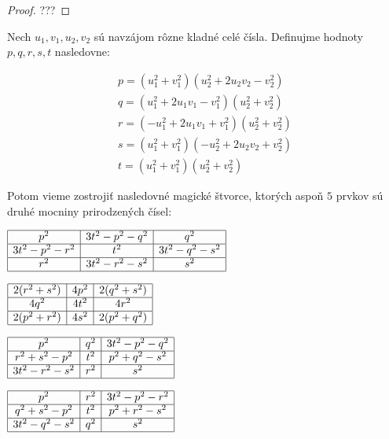 \begin{proof} 
???
\end{proof}

\begin{theorem}
\label{3x3square5squares}
Nech $u_1, v_1, u_2, v_2$ sú navzájom rôzne kladné celé čísla. Definujme hodnoty $p,q,r,s,t$ nasledovne:

\begin{gather}
p = (u_1^2 + v_1^2)(u_2^2 + 2u_2 v_2 - v_2^2) \\
q = (u_1^2 + 2u_1 v_1 - v_1^2)(u_2^2 + v_2^2) \\
r = (- u_1^2 + 2u_1 v_1 + v_1^2)(u_2^2 + v_2^2) \\
s = (u_1^2 + v_1^2)(-u_2^2 + 2u_2 v_2 + v_2^2) \\
t = (u_1^2 + v_1^2)(u_2^2 + v_2^2)
\end{gather}

Potom vieme zostrojiť nasledovné magické štvorce, ktorých aspoň $5$ prvkov sú druhé mocniny prirodzených čísel:
\end{theorem}

\begin{center}
$\begin{array}{ |c|c|c| } 
\hline
p^2 & 3t^2 - p^2 - q^2 & q^2 \\ 
\hline
3t^2 - p^2 - r^2 & t^2 & 3t^2 - q^2 - s^2 \\ 
\hline
r^2 & 3t^2 - r^2 - s^2 & s^2 \\
\hline
\end{array}$

$\begin{array}{ |c|c|c| } 
\hline
2(r^2 + s^2) & 4p^2 & 2(q^2 + s^2) \\ 
\hline
4q^2 & 4t^2 & 4r^2 \\ 
\hline
2(p^2 + r^2) & 4s^2 & 2(p^2 + q^2) \\
\hline
\end{array}$

$\begin{array}{ |c|c|c| } 
\hline
p^2 & q^2 & 3t^2 - p^2 - q^2 \\ 
\hline
r^2 + s^2 - p^2 & t^2 & p^2 + q^2 - s^2 \\ 
\hline
3t^2 - r^2 - s^2 & r^2 & s^2 \\
\hline
\end{array}$

$\begin{array}{ |c|c|c| } 
\hline
p^2 & r^2 & 3t^2 - p^2 - r^2 \\ 
\hline
q^2 + s^2 - p^2 & t^2 & p^2 + r^2 - s^2 \\ 
\hline
3t^2 - q^2 - s^2 & q^2 & s^2 \\
\hline
\end{array}$
\end{center}

